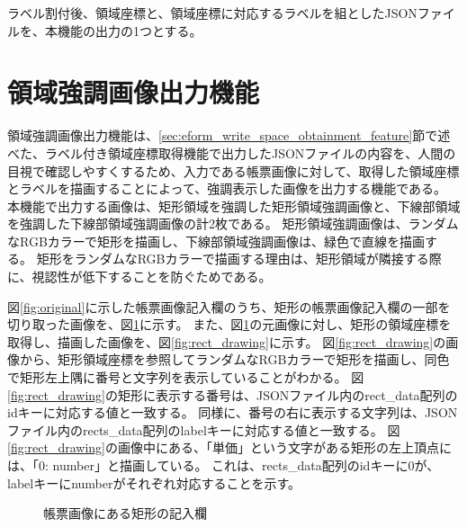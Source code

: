 ラベル割付後、領域座標と、領域座標に対応するラベルを組としたJSONファイルを、本機能の出力の1つとする。


\section{領域強調画像出力機能}\label{sec:highlighted_area_image_output}
領域強調画像出力機能は、\ref{sec:eform_write_space_obtainment_feature}節で述べた、ラベル付き領域座標取得機能で出力したJSONファイルの内容を、人間の目視で確認しやすくするため、入力である帳票画像に対して、取得した領域座標とラベルを描画することによって、強調表示した画像を出力する機能である。
本機能で出力する画像は、矩形領域を強調した矩形領域強調画像と、下線部領域を強調した下線部領域強調画像の計2枚である。
矩形領域強調画像は、ランダムなRGBカラーで矩形を描画し、下線部領域強調画像は、緑色で直線を描画する。
矩形をランダムなRGBカラーで描画する理由は、矩形領域が隣接する際に、視認性が低下することを防ぐためである。

図\ref{fig:original}に示した帳票画像記入欄のうち、矩形の帳票画像記入欄の一部を切り取った画像を、図\ref{fig:rect_original}に示す。
また、図\ref{fig:rect_original}の元画像に対し、矩形の領域座標を取得し、描画した画像を、図\ref{fig:rect_drawing}に示す。
図\ref{fig:rect_drawing}の画像から、矩形領域座標を参照してランダムなRGBカラーで矩形を描画し、同色で矩形左上隅に番号と文字列を表示していることがわかる。
図\ref{fig:rect_drawing}の矩形に表示する番号は、JSONファイル内のrect\_data配列のidキーに対応する値と一致する。
同様に、番号の右に表示する文字列は、JSONファイル内のrects\_data配列のlabelキーに対応する値と一致する。
図\ref{fig:rect_drawing}の画像中にある、「単価」という文字がある矩形の左上頂点には、「0: number」と描画している。
これは、rects\_data配列のidキーに0が、labelキーにnumberがそれぞれ対応することを示す。

\begin{figure}[t]
    \begin{center}
        \caption{帳票画像にある矩形の記入欄}
        \label{fig:rect_original}
    \end{center}
\end{figure}

